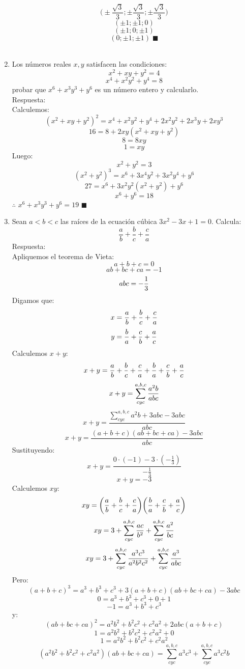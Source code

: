 \documentclass{book}
\begin{document}
\begin{enumerate}
          $$\bigg(\pm\frac{\sqrt{3}}{3};\pm\frac{\sqrt{3}}{3};\pm\frac{\sqrt{3}}{3}\bigg)$$
          $$(\pm 1; \pm 1;0)$$
          $$(\pm 1;0;\pm 1)$$
          $$(0;\pm 1;\pm 1)\;\blacksquare$$ \\
    \item Los números reales $x,y$ satisfacen las condiciones:
          $$x^2+xy+y^2=4$$
          $$x^4+x^2y^2+y^4=8$$
          probar que $x^6 + x^3y^3 + y^6$ es un número entero y calcularlo.\\
          Respuesta:\\
          Calculemos:
          $${( x^2 + xy + y^2 )}^2=x^4 +x^2 y^2 +y^4+2x^2 y^2+2x^3 y+2xy^3$$
          $$16=8+2xy( x^2 + xy + y^2  )$$
          $$8=8xy$$
          $$1=xy$$
          Luego:
          $$ x^2 + y^2=3$$
          $${(x^2 + y^2 )}^3=x^6+3x^4 y^2+3x^2 y^4+y^6$$
          $$27=x^6+3x^2 y^2 (x^2+y^2 )+y^6$$
          $$x^6 + y^6=18$$
          $\therefore$ $x^6 + x^3 y^3 + y^6=19$ $\blacksquare$\\
    \item Sean $a < b < c$ las raíces de la ecuación cúbica $3x^2-3x+1=0$. Calcula:
          $$\frac{a}{b}+\frac{b}{c}+\frac{c}{a}$$
          Respuesta:\\
          Apliquemos el teorema de Vieta:
          $$a+b+c=0$$
          $$ab+bc+ca=-1$$
          $$abc=-{1\over 3}$$
          Digamos que:
          $$x={a\over b}+{b\over c}+{c\over a}$$
          $$y={b\over a}+{c\over b}+{a\over c}$$
          Calculemos $x+y$:
          $$x+y={a\over b}+{b\over c}+{c\over a}+{b\over a}+{c\over b}+{a\over c}$$
          $$x+y=\sum_{cyc}^{a,b,c}{a^2 b\over abc}$$
          $$x+y=\frac{\sum_{cyc}^{a,b,c}a^2 b+3abc-3abc}{abc}$$
          $$x+y=\frac{(a+b+c)(ab+bc+ca)-3abc}{abc}$$
          Sustituyendo:
          $$x+y=\frac{0\cdot(-1)-3\cdot(-\frac{1}{3})}{-\frac{1}{3}}$$
          $$x+y=-3$$
          Calculemos $xy$:
          $$xy=\bigg({a\over b}+{b\over c}+{c\over a}\bigg)\bigg({b\over a}+{c\over b}+{a\over c}\bigg)$$
          $$xy=3+\sum_{cyc}^{a,b,c}{ac\over b^2} +\sum_{cyc}^{a,b,c}{ a^2\over bc}$$
          $$xy=3+\sum_{cyc}^{a,b,c}\frac{a^3 c^3}{a^2 b^2 c^2}+\sum_{cyc}^{a,b,c}{ a^3\over abc}$$
          Pero:
          $${(a+b+c)}^3=a^3+b^3+c^3+3(a+b+c)(ab+bc+ca)-3abc$$
          $$0=a^3+b^3+c^3+0+1$$
          $$-1=a^3+b^3+c^3$$
          y:
          $${(ab+bc+ca)}^2=a^2 b^2+b^2 c^2+c^2 a^2+2abc(a+b+c)$$
          $$1=a^2 b^2+b^2 c^2+c^2 a^2+0$$
          $$1=a^2 b^2+b^2 c^2+c^2 a^2$$
          $$(a^2 b^2+b^2 c^2+c^2 a^2 )(ab+bc+ca)=\sum_{cyc}^{a,b,c}a^3 c^3+\sum_{cyc}^{a,b,c}a^3 c^2 b$$

\end{enumerate}
\end{document}
